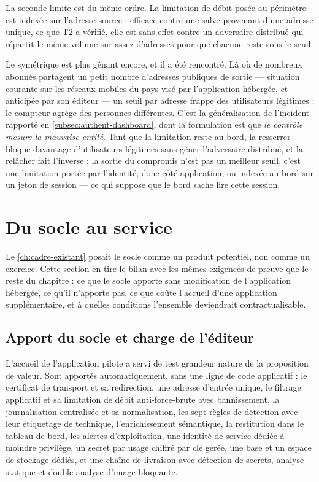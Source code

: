 La seconde limite est du même ordre. La limitation de débit posée au périmètre est indexée sur
l'adresse source : efficace contre une salve provenant d'une adresse unique, ce que T2 a vérifié,
elle est sans effet contre un adversaire distribué qui répartit le même volume sur assez d'adresses
pour que chacune reste sous le seuil.

Le symétrique est plus gênant encore, et il a été rencontré. Là où de nombreux abonnés partagent un
petit nombre d'adresses publiques de sortie --- situation courante sur les réseaux mobiles du pays
visé par l'application hébergée, et anticipée par son éditeur --- un seuil par adresse frappe des
utilisateurs légitimes : le compteur agrège des personnes différentes. C'est la généralisation de
l'incident rapporté en \cref{subsec:authent-dashboard}, dont la formulation est que \emph{le
contrôle mesure la mauvaise entité}. Tant que la limitation reste au bord, la resserrer bloque
davantage d'utilisateurs légitimes sans gêner l'adversaire distribué, et la relâcher fait
l'inverse : la sortie du compromis n'est pas un meilleur seuil, c'est une limitation portée par
l'identité, donc côté application, ou indexée au bord sur un jeton de session --- ce qui suppose
que le bord sache lire cette session.

\section{Du socle au service}
\label{sec:socle-service}

Le \cref{ch:cadre-existant} posait le socle comme un produit potentiel, non comme un exercice. Cette section en
tire le bilan avec les mêmes exigences de preuve que le reste du chapitre : ce que le socle apporte
sans modification de l'application hébergée, ce qu'il n'apporte pas, ce que coûte l'accueil d'une
application supplémentaire, et à quelles conditions l'ensemble deviendrait contractualisable.

\subsection{Apport du socle et charge de l'éditeur}

L'accueil de l'application pilote a servi de test grandeur nature de la proposition de valeur.
Sont apportés automatiquement, sans une ligne de code applicatif : le certificat de transport et sa
redirection, une adresse d'entrée unique, le filtrage applicatif et sa limitation de débit
anti-force-brute avec bannissement, la journalisation centralisée et sa normalisation, les sept
règles de détection avec leur étiquetage de technique, l'enrichissement sémantique, la restitution
dans le tableau de bord, les alertes d'exploitation, une identité de service dédiée à moindre
privilège, un secret par usage chiffré par clé gérée, une base et un espace de stockage dédiés, et
une chaîne de livraison avec détection de secrets, analyse statique et double analyse d'image
bloquante.

